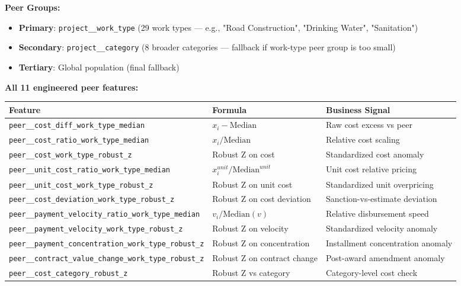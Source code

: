 \documentclass[11pt,a4paper]{article}
\begin{document}
\textbf{Peer Groups:}
\begin{itemize}[leftmargin=1.5em, itemsep=2pt, topsep=3pt]
\item \textbf{Primary}: \texttt{project\_\_work\_type} (29 work types --- e.g., "Road Construction", "Drinking Water", "Sanitation")
\item \textbf{Secondary}: \texttt{project\_\_category} (8 broader categories --- fallback if work-type peer group is too small)
\item \textbf{Tertiary}: Global population (final fallback)
\end{itemize}

\textbf{All 11 engineered peer features:}

\begin{table}[htbp]
\centering
\small
\begin{tabularx}{\textwidth}{l l Y}
\toprule
\textbf{Feature} & \textbf{Formula} & \textbf{Business Signal} \\
\midrule
\texttt{peer\_\_cost\_diff\_work\_type\_median} & $x_i - \text{Median}$ & Raw cost excess vs peer \\
\texttt{peer\_\_cost\_ratio\_work\_type\_median} & $x_i / \text{Median}$ & Relative cost scaling \\
\texttt{peer\_\_cost\_work\_type\_robust\_z} & Robust Z on cost & Standardized cost anomaly \\
\texttt{peer\_\_unit\_cost\_ratio\_work\_type\_median} & $x_i^{unit} / \text{Median}^{unit}$ & Unit cost relative pricing \\
\texttt{peer\_\_unit\_cost\_work\_type\_robust\_z} & Robust Z on unit cost & Standardized unit overpricing \\
\texttt{peer\_\_cost\_deviation\_work\_type\_robust\_z} & Robust Z on cost deviation & Sanction-vs-estimate deviation \\
\texttt{peer\_\_payment\_velocity\_ratio\_work\_type\_median} & $v_i / \text{Median}(v)$ & Relative disbursement speed \\
\texttt{peer\_\_payment\_velocity\_work\_type\_robust\_z} & Robust Z on velocity & Standardized velocity anomaly \\
\texttt{peer\_\_payment\_concentration\_work\_type\_robust\_z} & Robust Z on concentration & Installment concentration anomaly \\
\texttt{peer\_\_contract\_value\_change\_work\_type\_robust\_z} & Robust Z on contract change & Post-award amendment anomaly \\
\texttt{peer\_\_cost\_category\_robust\_z} & Robust Z vs category & Category-level cost check \\
\bottomrule
\end{tabularx}
\end{table}
\end{document}
